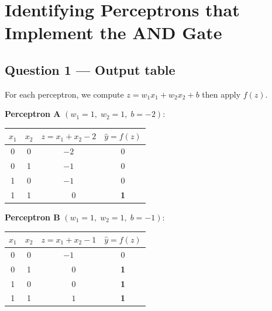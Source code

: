 \documentclass[11pt, a4paper]{article}
\begin{document}


\section{Identifying Perceptrons that Implement the AND Gate}

\subsection*{Question 1 — Output table}

For each perceptron, we compute $z = w_1 x_1 + w_2 x_2 + b$ then apply $f(z)$.

\vspace{0.5em}

\textbf{Perceptron A} $(w_1=1,\; w_2=1,\; b=-2)$:

\begin{center}
\renewcommand{\arraystretch}{1.4}
\begin{tabular}{cc|cc}
\toprule
$x_1$ & $x_2$ & $z = x_1 + x_2 - 2$ & $\hat{y} = f(z)$ \\
\midrule
0 & 0 & $-2$ & 0 \\
0 & 1 & $-1$ & 0 \\
1 & 0 & $-1$ & 0 \\
1 & 1 & $\phantom{-}0$ & \textbf{1} \\
\bottomrule
\end{tabular}
\end{center}

\textbf{Perceptron B} $(w_1=1,\; w_2=1,\; b=-1)$:

\begin{center}
\renewcommand{\arraystretch}{1.4}
\begin{tabular}{cc|cc}
\toprule
$x_1$ & $x_2$ & $z = x_1 + x_2 - 1$ & $\hat{y} = f(z)$ \\
\midrule
0 & 0 & $-1$ & 0 \\
0 & 1 & $\phantom{-}0$ & \textbf{1} \\
1 & 0 & $\phantom{-}0$ & \textbf{1} \\
1 & 1 & $\phantom{-}1$ & \textbf{1} \\
\bottomrule
\end{tabular}
\end{center}
\end{document}
